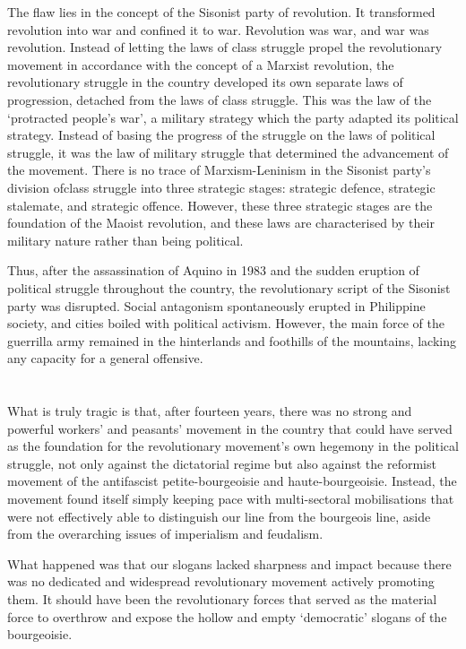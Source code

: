 The flaw lies in the concept of the Sisonist party of revolution. 
It transformed revolution into war 
and confined it to war. 
Revolution was war, 
and war was revolution. 
Instead of letting the laws of class struggle 
propel the revolutionary movement 
in accordance with the concept of a Marxist revolution, 
the revolutionary struggle in the country 
developed its own separate laws of progression, 
detached from the laws of class struggle. 
This was the law of the `protracted people's war', 
a military strategy which the party adapted its political strategy. 
Instead of basing the progress of the struggle
on the laws of political struggle, 
it was the law of military struggle 
that determined the advancement of the movement. 
There is no trace of Marxism-Leninism 
in the Sisonist party's division ofclass struggle into three strategic stages: 
strategic defence, strategic stalemate, and strategic offence. 
However, 
these three strategic stages 
are the foundation of the Maoist revolution, 
and these laws are characterised 
by their military nature rather than being political.

Thus, after the assassination of Aquino in 1983 
and the sudden eruption of political struggle throughout the country, 
the revolutionary script of the Sisonist party was disrupted. 
Social antagonism spontaneously erupted in Philippine society, 
and cities boiled with political activism. 
However, the main force of the guerrilla army 
remained in the hinterlands and foothills of the mountains, 
lacking any capacity for a general offensive.


\section{}
What is truly tragic is that, 
after fourteen years, 
there was no strong and powerful workers' and peasants' movement in the country 
that could have served as the foundation 
for the revolutionary movement's own hegemony in the political struggle, 
not only against the dictatorial regime 
but also against the reformist movement 
of the antifascist petite-bourgeoisie and haute-bourgeoisie. 
Instead, the movement found itself simply keeping pace 
with multi-sectoral mobilisations 
that were not effectively able to distinguish our line
from the bourgeois line, 
aside from the overarching issues of imperialism and feudalism.

What happened was that our slogans lacked sharpness and impact 
because there was no dedicated and widespread revolutionary movement 
actively promoting them. 
It should have been the revolutionary forces 
that served as the material force 
to overthrow and expose 
the hollow and empty `democratic' slogans of the bourgeoisie.


